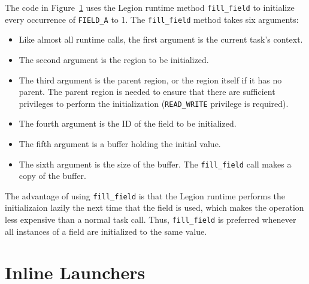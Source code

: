 \begin{figure}
  {\small
  }
\caption{}
\label{fig:fill}
\end{figure}
The code in Figure~\ref{fig:fill} uses the Legion runtime method {\tt fill\_field} to initialize every 
occurrence of {\tt FIELD\_A} to 1.  The {\tt fill\_field} method takes six arguments:

\begin{itemize}

\item Like almost all runtime calls, the first argument is the current task's context.

\item The second argument is the region to be initialized.

\item The third argument is the parent region, or the region itself if it has no parent.  The parent region is needed
to ensure that there are sufficient privileges to perform the initialization ({\tt READ\_WRITE} privilege
is required).

\item The fourth argument is the ID of the field to be initialized.

\item The fifth argument is a buffer holding the initial value.

\item The sixth argument is the size of the buffer.  
The {\tt fill\_field} call makes a copy of the buffer.

\end{itemize}

The advantage of using {\tt fill\_field} is that the Legion runtime performs the initializaion lazily the next time that
the field is used, which makes the operation less expensive than a normal task call.  Thus, {\tt fill\_field} is preferred
whenever all instances of a field are initialized to the same value.


\section{Inline Launchers}
\label{sec:inlinelaunch}


